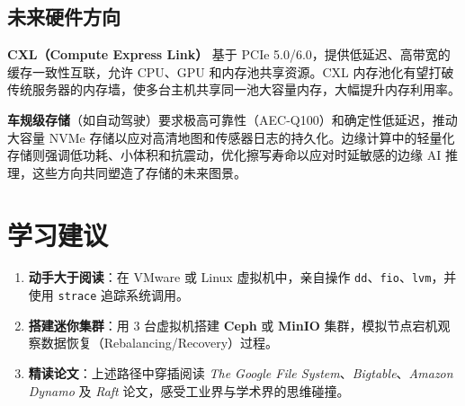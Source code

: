 \documentclass[12pt,UTF8]{ctexbook}
\begin{document}
	\section{未来硬件方向}
	
	\textbf{CXL（Compute Express Link）} 基于 PCIe 5.0/6.0，提供低延迟、高带宽的缓存一致性互联，允许 CPU、GPU 和内存池共享资源。CXL 内存池化有望打破传统服务器的内存墙，使多台主机共享同一池大容量内存，大幅提升内存利用率。
	
	\textbf{车规级存储}（如自动驾驶）要求极高可靠性（AEC-Q100）和确定性低延迟，推动大容量 NVMe 存储以应对高清地图和传感器日志的持久化。边缘计算中的轻量化存储则强调低功耗、小体积和抗震动，优化擦写寿命以应对时延敏感的边缘 AI 推理，这些方向共同塑造了存储的未来图景。
	
	\chapter*{学习建议}
	\begin{enumerate}
		\item \textbf{动手大于阅读}：在 VMware 或 Linux 虚拟机中，亲自操作 \texttt{dd}、\texttt{fio}、\texttt{lvm}，并使用 \texttt{strace} 追踪系统调用。
		\item \textbf{搭建迷你集群}：用 3 台虚拟机搭建 \textbf{Ceph} 或 \textbf{MinIO} 集群，模拟节点宕机观察数据恢复（Rebalancing/Recovery）过程。
		\item \textbf{精读论文}：上述路径中穿插阅读 \textit{The Google File System}、\textit{Bigtable}、\textit{Amazon Dynamo} 及 \textit{Raft} 论文，感受工业界与学术界的思维碰撞。
	\end{enumerate}
	
\end{document}
